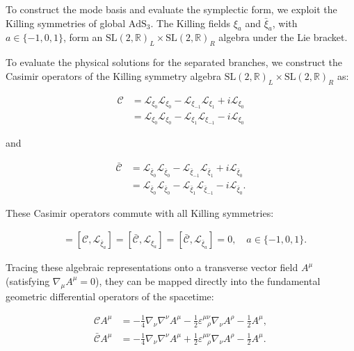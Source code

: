 To construct the mode basis and evaluate the symplectic form, we exploit the Killing symmetries of global $\mathrm{AdS}_3$. The Killing fields $\xi_a$ and $\bar{\xi}_a$, with $a \in \{-1,0,1\}$, form an $\mathrm{SL}(2, \mathbb{R})_L \times \mathrm{SL}(2, \mathbb{R})_R$ algebra under the Lie bracket.

To evaluate the physical solutions for the separated branches, we construct the Casimir operators of the Killing symmetry algebra $\mathrm{SL}(2, \mathbb{R})_L \times \mathrm{SL}(2, \mathbb{R})_R$ as:

 \begin{align}
\mathcal{C} & =\mathcal{L}_{\xi_{0}}\mathcal{L}_{\xi_{0}}-\mathcal{L}_{\xi _{-1}}\mathcal{L}_{\xi _{1}}+i\mathcal{L}_{\xi_{0}} \\
 & =\mathcal{L}_{\xi _{0}}\mathcal{L}_{\xi_{0}}-\mathcal{L}_{\xi_{1}}\mathcal{L}_{\xi _{-1}}-i\mathcal{L}_{\xi_{0}}
\end{align}

and

 \begin{align}
\mathcal{\bar{C}} & =\mathcal{L}_{\bar{\xi}_{0}}\mathcal{L}_{\bar{\xi}_{0}}-\mathcal{L}_{\bar{\xi}_{-1}}\mathcal{L}_{\bar{\xi}_{1}}+i\mathcal{L}_{\bar{\xi}_{0}} \\
 & =\mathcal{L}_{\bar{\xi}_{0}}\mathcal{L}_{\bar{\xi}_{0}}-\mathcal{L}_{\bar{\xi}_{1}}\mathcal{L}_{\bar{\xi}_{-1}}-i\mathcal{L}_{\bar{\xi}_{0}}.
\end{align}

These Casimir operators commute with all Killing symmetries:

 \begin{align}
[\mathcal{C},\mathcal{L}_{\xi _{a}}] & =[\mathcal{C},\mathcal{L}_{\bar{\xi}_{a}}]=[\mathcal{\bar{C}},\mathcal{L}_{\xi _{a}}]=[\mathcal{\bar{C}},\mathcal{L}_{\bar{\xi}_{a}}]=0, \quad a \in \{-1,0,1\}.
\end{align}

Tracing these algebraic representations onto a transverse vector field $A^{\mu}$ (satisfying $\nabla_{\mu}A^{\mu}=0$), they can be mapped directly into the fundamental geometric differential operators of the spacetime:

 \begin{align}
\mathcal{C}A^{\mu} & =-\frac{1}{4}\nabla _{\nu}\nabla ^{\nu}A^{\mu}-\frac{1}{2}\varepsilon ^{\mu \nu}_{~~~\rho}\nabla _{\nu}A^{\rho}-\frac{1}{2}A^{\mu}, \\
\mathcal{\bar{C}}A^{\mu} & =-\frac{1}{4}\nabla _{\nu}\nabla ^{\nu}A^{\mu}+\frac{1}{2}\varepsilon ^{\mu \nu}_{~~~\rho}\nabla _{\nu}A^{\rho}-\frac{1}{2}A^{\mu}.
\end{align}

